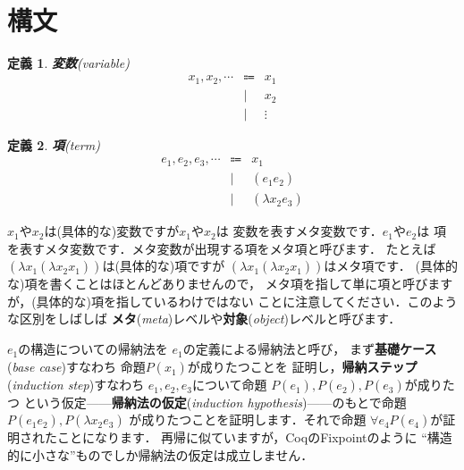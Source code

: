 \documentclass{ltjsbook}%
\newtheorem{definition}{定義}[section]%
\newcommand\term[2]{\textbf{#1}{(\textit{#2})}}%
\begin{document}
\section{構文}%
\label{untyped:syntax}%
\begin{definition}%
  \par\term{変数}{variable}%
  \begin{equation}%
    \begin{array}{lrl}%
      \mathit{x}_1^{},\mathit{x}_2^{},\cdots%
      & \Coloneqq & x_1^{}\\%
      &         | & x_2^{}\\%
      &         | & \vdots%
    \end{array}%
  \end{equation}%
\end{definition}%
\begin{definition}%
\term{項}{term}%
\begin{equation}%
  \begin{array}{lrl}%
    \mathit{e}_1^{},\mathit{e}_2^{},\mathit{e}_3^{},\cdots%
    & \Coloneqq & \mathit{x}_1^{}\\%
    &         | & (\mathit{e}_1^{}\mathit{e}_2^{})\\%
    &         | & (\lambda\mathit{x}_2^{}\mathit{e}_3^{})%
  \end{array}%
\end{equation}%
\end{definition}%
\par$x_1^{}$や$x_2^{}$は(具体的な)変数ですが$\mathit{x}_1^{}$や$\mathit{x}_2^{}$は%
変数を表すメタ変数です．$\mathit{e}_1^{}$や$\mathit{e}_2^{}$は%
項を表すメタ変数です．メタ変数が出現する項をメタ項と呼びます．%
たとえば$(\lambda x_1^{}(\lambda x_2^{}x_1^{}))$は(具体的な)項ですが%
$(\lambda\mathit{x}_1^{}(\lambda\mathit{x}_2^{}\mathit{x}_1^{}))$はメタ項です．%
(具体的な)項を書くことはほとんどありませんので，%
メタ項を指して単に項と呼びますが，(具体的な)項を指しているわけではない%
ことに注意してください．このような区別をしばしば%
\term{メタ}{meta}レベルや\term{対象}{object}レベルと呼びます．%
\par$\mathit{e}_1^{}$の構造についての帰納法を%
$\mathit{e}_1^{}$の定義による帰納法と呼び，%
まず\term{基礎ケース}{base case}すなわち%
命題$P(\mathit{x}_1^{})$が成りたつことを%
証明し，\term{帰納ステップ}{induction step}すなわち%
$\mathit{e}_1^{},\mathit{e}_2^{},\mathit{e}_3^{}$について命題%
$P(\mathit{e}_1^{}),P(\mathit{e}_2^{}),P(\mathit{e}_3^{})$が成りたつ%
という仮定------\term{帰納法の仮定}{induction hypothesis}------のもとで命題%
$P(\mathit{e}_1^{}\mathit{e}_2^{}),P(\lambda\mathit{x}_2^{}\mathit{e}_3^{})$%
が成りたつことを証明します．それで命題%
$\forall\mathit{e}_4^{}P(\mathit{e}_4^{})$が証明されたことになります．%
再帰に似ていますが，CoqのFixpointのように%
``構造的に小さな''ものでしか帰納法の仮定は成立しません．%
\end{document}
